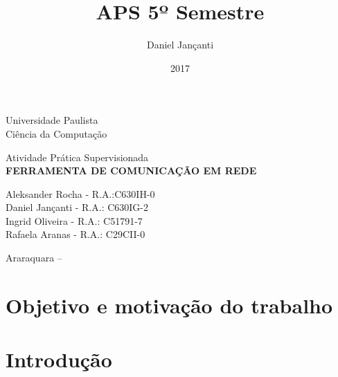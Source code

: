 \documentclass[12pt, a4paper]{article}
\title{APS 5º Semestre}
\author{Daniel Jançanti}
\date{2017}
\begin{document}
	\begin{center}
		\Huge Universidade Paulista\\
		\large Ciência da Computação
		
		\vfill
		
		\large Atividade Prática Supervisionada\\
		\textbf{\MakeUppercase{Ferramenta de comunicação em rede}}
		
		\bigskip
		\bigskip
		
		\normalsize{
			Aleksander Rocha - R.A.:C630IH-0\\
			Daniel Jançanti - R.A.: C630IG-2\\
			Ingrid Oliveira - R.A.: C51791-7\\
			Rafaela Aranas - R.A.: C29CII-0\\	
		}
		
		\vfill
		
		Araraquara -- \the\year
		
	\end{center}
	
	\thispagestyle{empty}
	
	\newpage
	\tableofcontents
	\thispagestyle{empty}
	
	\newpage
	\section{Objetivo e motivação do trabalho}
	\lipsum[1]
	
	\newpage
	\section{Introdução}
	\lipsum[1]
\end{document}
